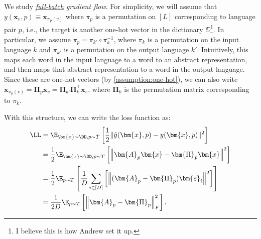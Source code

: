 \documentclass{article}
\begin{document}
We study \emph{\underline{full-batch} gradient flow}.
For simplicity, we will assume that $y(\bm{x}_v, p) \equiv \bm{x}_{\pi_p(v)}$ where $\pi_p$ is a permutation on $[L]$ corresponding to language pair $p$, i.e., the target is another one-hot vector in the dictionary $\DD$\footnote{I believe this is how Andrew set it up.}.
In particular, we assume $\pi_p = \pi_{k'} \circ \pi_k^{-1}$, where $\pi_k$ is a permutation on the input language $k$ and $\pi_{k'}$ is a permutation on the output language $k'$.
Intuitively, this maps each word in the input language to a word to an abstract representation, and then maps that abstract representation to a word in the output language.
Since these are one-hot vectors (by \cref{assumption:one-hot}), we can also write $\bm{x}_{\pi_p(v)} = \bm{\Pi}_p \bm{x}_v = \bm{\Pi}_{k'} \bm{\Pi}_k^\top \bm{x}_v$, where $\bm{\Pi}_k$ is the permutation matrix corresponding to $\pi_k$.

With this structure, we can write the loss function as:
\begin{align*}
    \LL &= \E_{\bm{x} \sim \DD, p \sim T} \left[ \frac{1}{2} \| \hat{y}(\bm{x}, p) - y(\bm{x}, p) \|^2 \right] \\
    &= \frac{1}{2} \E_{\bm{x} \sim \DD, p \sim T} \left[ \left\Vert \bm{A}_p \bm{x} - \bm{\Pi}_p \bm{x} \right\Vert^2 \right] \\
    &= \frac{1}{2} \E_{p \sim T} \left[ \frac{1}{D} \sum_{i\in[D]} \left[ \left\Vert ( \bm{A}_p - \bm{\Pi}_p ) \bm{e}_i \right\Vert^2 \right] \right] \\ %
    &= \frac{1}{2D} \E_{p \sim T} \left[ \left\Vert \bm{A}_p - \bm{\Pi}_p \right\Vert_F^2 \right].
\end{align*}
\end{document}
